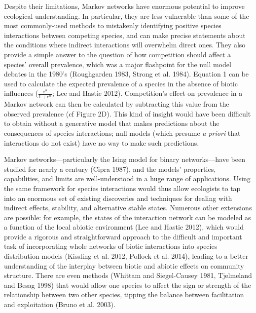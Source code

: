 \documentclass[12pt,]{article}
\begin{document}
\begin{spacing}{1.9}
\begin{flushleft}
Despite their limitations, Markov networks have enormous potential to
improve ecological understanding. In particular, they are less
vulnerable than some of the most commonly-used methods to mistakenly
identifying positive species interactions between competing species, and
can make precise statements about the conditions where indirect
interactions will overwhelm direct ones. They also provide a simple
answer to the question of how competition should affect a species'
overall prevalence, which was a major flashpoint for the null model
debates in the 1980's (Roughgarden 1983, Strong et al. 1984). Equation 1
can be used to calculate the expected prevalence of a species in the
absence of biotic influences (\(\frac{e^\alpha}{1 + e^{\alpha}}\); Lee
and Hastie 2012). Competition's effect on prevalence in a Markov network
can then be calculated by subtracting this value from the observed
prevalence (cf Figure 2D). This kind of insight would have been
difficult to obtain without a generative model that makes predictions
about the consequences of species interactions; null models (which
presume \emph{a priori} that interactions do not exist) have no way to
make such predictions.

Markov networks---particularly the Ising model for binary
networks---have been studied for nearly a century (Cipra 1987), and the
models' properties, capabilities, and limits are well-understood in a
huge range of applications. Using the same framework for species
interactions would thus allow ecologists to tap into an enormous set of
existing discoveries and techniques for dealing with indirect effects,
stability, and alternative stable states. Numerous other extensions are
possible: for example, the states of the interaction network can be
modeled as a function of the local abiotic environment (Lee and Hastie
2012), which would provide a rigorous and straightforward approach to
the difficult and important task of incorporating whole networks of
biotic interactions into species distribution models (Kissling et al.
2012, Pollock et al. 2014), leading to a better understanding of the
interplay between biotic and abiotic effects on community structure.
There are even methods (Whittam and Siegel-Causey 1981, Tjelmeland and
Besag 1998) that would allow one species to affect the sign or strength
of the relationship between two other species, tipping the balance
between facilitation and exploitation (Bruno et al. 2003).


\end{flushleft}
\end{spacing}
\end{document}
